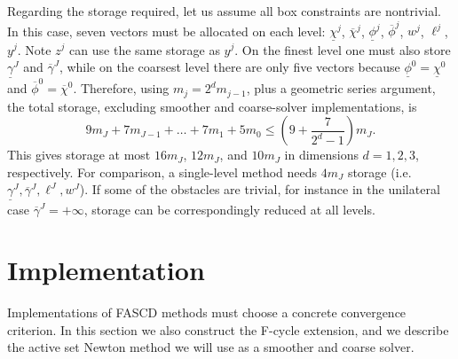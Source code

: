 \documentclass[letterpaper,final,12pt,reqno]{amsart}
\theoremstyle{cstyle}
\theoremstyle{cstyle*}
\theoremstyle{dstyle}
\numberwithin{equation}{section}
\numberwithin{figure}{section}
\numberwithin{table}{section}
\numberwithin{theorem}{section}
\begin{document}
Regarding the storage required, let us assume all box constraints are nontrivial. In this case, seven vectors must be allocated on each level: $\underline{\chi}^j$, $\overline{\chi}^j$, $\underline{\phi}^j$, $\overline{\phi}^j$, $w^j$, $\ell^j$, $y^j$.  Note $z^j$ can use the same storage as $y^j$.  On the finest level one must also store $\underline{\gamma}^J$ and $\overline{\gamma}^J$, while on the coarsest level there are only five vectors because $\underline{\phi}^0=\underline{\chi}^0$ and $\overline{\phi}^0=\overline{\chi}^0$.  Therefore, using $m_j=2^d m_{j-1}$, plus a geometric series argument, the total storage, excluding smoother and coarse-solver implementations, is
\begin{equation}
9 m_J + 7 m_{J-1} + \dots + 7 m_1 + 5 m_0 \le \left(9 + \frac{7}{2^d - 1}\right) m_J.
\end{equation}
This gives storage at most $16m_J$, $12m_J$, and $10m_J$ in dimensions $d=1,2,3$, respectively.  For comparison, a single-level method needs $4 m_J$ storage (i.e.~$\underline{\gamma}^J,\overline{\gamma}^J,\ell^J,w^J$).  If some of the obstacles are trivial, for instance in the unilateral case $\overline{\gamma}^J=+\infty$, storage can be correspondingly reduced at all levels.


\section{Implementation} \label{sec:implementation}

Implementations of FASCD methods must choose a concrete convergence criterion.  In this section we also construct the F-cycle extension, and we describe the active set Newton method we will use as a smoother and coarse solver.
\end{document}
